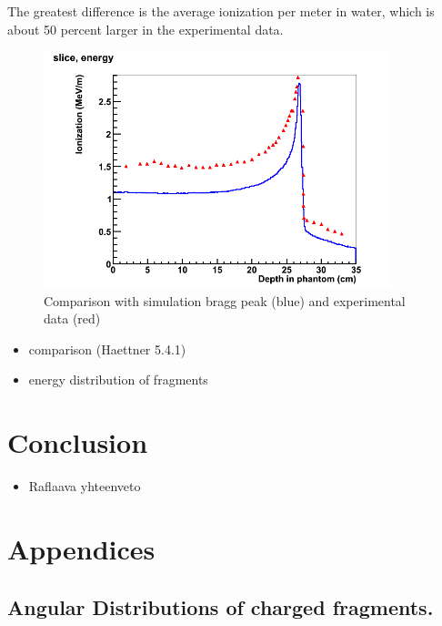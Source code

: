 The greatest difference is the average ionization per meter in water, which is about 50 percent larger in the experimental data.

\begin{figure}[h] 
\begin{center}
\includegraphics[width=0.9\textwidth]{images/plots/braggPeak/braggPeakCompared.png}  
\caption{\label{fig:braggPeakCompared} Comparison with simulation bragg peak (blue) and experimental data (red)}
 \end{center}
 \end{figure}

\begin{itemize}
\item comparison (Haettner 5.4.1)
\item energy distribution of fragments
\end{itemize}

\section{Conclusion}
\begin{itemize}
\item Raflaava yhteenveto
\end{itemize}

\section{Appendices}
\subsection{Angular Distributions of charged fragments.\label{AngularDistributionAppendix}}
